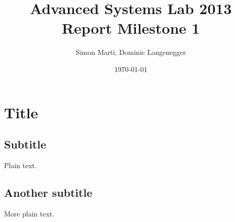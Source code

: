 \documentclass{article}
\title{Advanced Systems Lab 2013\\Report Milestone 1}
\author{Simon Marti, Dominic Langenegger}
\date{\today}
\begin{document}
\maketitle

\section{Title}

\subsection{Subtitle}

Plain text.

\subsection{Another subtitle}

More plain text.
\end{document}
